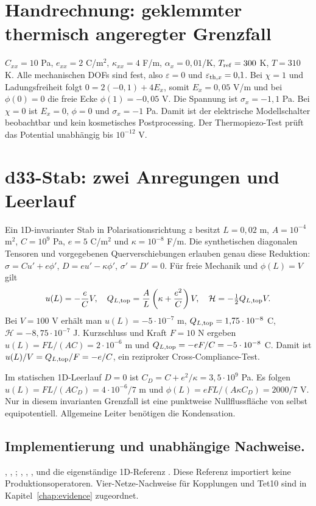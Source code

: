 \section{Handrechnung: geklemmter thermisch angeregter Grenzfall}
$C_{xx}=10$ Pa, $e_{xx}=2$ C/m$^2$, $\kappa_{xx}=4$ F/m,
$\alpha_x=0{,}01$/K, $T_{\rm ref}=300$ K, $T=310$ K.
Alle mechanischen DOFs sind fest, also $\varepsilon=0$ und
$\varepsilon_{{\rm th},x}=0{,}1$.
Bei $\chi=1$ und Ladungsfreiheit folgt
$0=2(-0{,}1)+4E_x$, somit $E_x=0{,}05$ V/m und bei
$\phi(0)=0$ die freie Ecke $\phi(1)=-0{,}05$ V.
Die Spannung ist $\sigma_x=-1{,}1$ Pa.
Bei $\chi=0$ ist $E_x=0$, $\phi=0$ und $\sigma_x=-1$ Pa.
Damit ist der elektrische Modellschalter beobachtbar und kein kosmetisches
Postprocessing. Der Thermopiezo-Test prüft das Potential unabhängig bis
$10^{-12}$ V.

\section{d33-Stab: zwei Anregungen und Leerlauf}\label{sec:d33}
Ein 1D-invarianter Stab in Polarisationsrichtung $z$ besitzt
$L=0{,}02$ m, $A=10^{-4}$ m$^2$, $C=10^9$ Pa, $e=5$ C/m$^2$ und
$\kappa=10^{-8}$ F/m. Die synthetischen diagonalen Tensoren und vorgegebenen
Querverschiebungen erlauben genau diese Reduktion:
$\sigma=Cu'+e\phi'$, $D=eu'-\kappa\phi'$, $\sigma'=D'=0$.
Für freie Mechanik und $\phi(L)=V$ gilt
\begin{equation}\label{eq:d33-voltage}
u(L)=-\frac eC V,\quad
Q_{L,\rm top}=\frac AL\left(\kappa+\frac{e^2}{C}\right)V,\quad
\mathcal H=-\tfrac12Q_{L,\rm top}V.
\end{equation}
Bei $V=100$ V erhält man $u(L)=-5\cdot10^{-7}$ m,
$Q_{L,\rm top}=1{,}75\cdot10^{-8}$ C, $\mathcal H=-8{,}75\cdot10^{-7}$ J.
Kurzschluss und Kraft $F=10$ N ergeben
$u(L)=FL/(AC)=2\cdot10^{-6}$ m und
$Q_{L,\rm top}=-eF/C=-5\cdot10^{-8}$ C.
Damit ist $u(L)/V=Q_{L,\rm top}/F=-e/C$, ein reziproker Cross-Compliance-Test.

Im statischen 1D-Leerlauf $D=0$ ist $C_D=C+e^2/\kappa=3{,}5\cdot10^9$ Pa.
Es folgen $u(L)=FL/(AC_D)=4\cdot10^{-6}/7$ m und
$\phi(L)=eFL/(A\kappa C_D)=2000/7$ V.
Nur in diesem invarianten Grenzfall ist eine punktweise Nullflussfläche von
selbst equipotentiell. Allgemeine Leiter benötigen die Kondensation.

\subsection*{Implementierung und unabhängige Nachweise.}
{\small\raggedright
{},
,
;
,
,
,
 und die eigenständige
1D-Referenz .
Diese Referenz importiert keine Produktionsoperatoren. Vier-Netze-Nachweise
für Kopplungen und Tet10 sind in Kapitel~\ref{chap:evidence} zugeordnet.

\par}
